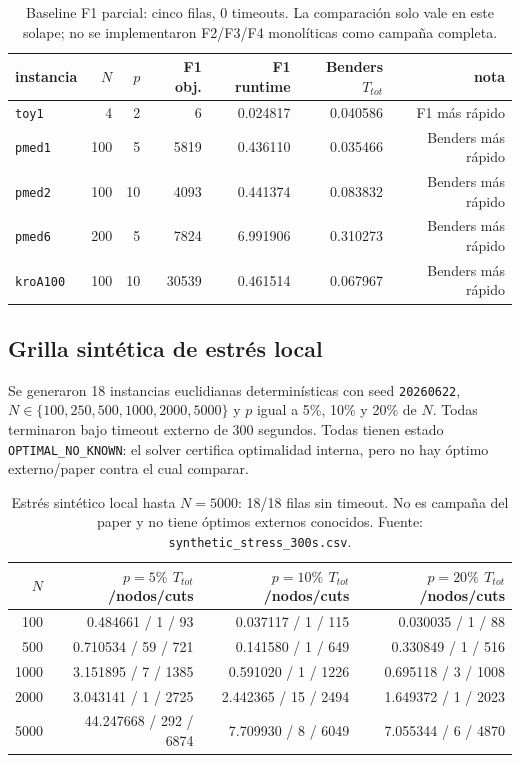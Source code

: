 \begin{table}[h]\centering\small
\begin{tabular}{lrrrrrr}
\toprule
instancia & $N$ & $p$ & F1 obj. & F1 runtime & Benders $T_{tot}$ & nota \\
\midrule
\texttt{toy1} & 4 & 2 & 6 & 0.024817 & 0.040586 & F1 más rápido \\
\texttt{pmed1} & 100 & 5 & 5819 & 0.436110 & 0.035466 & Benders más rápido \\
\texttt{pmed2} & 100 & 10 & 4093 & 0.441374 & 0.083832 & Benders más rápido \\
\texttt{pmed6} & 200 & 5 & 7824 & 6.991906 & 0.310273 & Benders más rápido \\
\texttt{kroA100} & 100 & 10 & 30539 & 0.461514 & 0.067967 & Benders más rápido \\
\bottomrule
\end{tabular}
\caption{Baseline F1 parcial: cinco filas, 0 timeouts. La comparación solo vale en este solape;
no se implementaron F2/F3/F4 monolíticas como campaña completa.}
\label{tab:f1baseline}
\end{table}

\subsection{Grilla sintética de estrés local}
Se generaron 18 instancias euclidianas determinísticas con seed \texttt{20260622},
$N\in\{100,250,500,1000,2000,5000\}$ y $p$ igual a 5\%, 10\% y 20\% de $N$. Todas terminaron bajo
timeout externo de 300 segundos. Todas tienen estado \texttt{OPTIMAL\_NO\_KNOWN}: el solver
certifica optimalidad interna, pero no hay óptimo externo/paper contra el cual comparar.

\begin{table}[h]\centering\small
\begin{tabular}{rrrr}
\toprule
$N$ & $p=5\%$ $T_{tot}$/nodos/cuts & $p=10\%$ $T_{tot}$/nodos/cuts & $p=20\%$ $T_{tot}$/nodos/cuts \\
\midrule
100 & 0.484661 / 1 / 93 & 0.037117 / 1 / 115 & 0.030035 / 1 / 88 \\
500 & 0.710534 / 59 / 721 & 0.141580 / 1 / 649 & 0.330849 / 1 / 516 \\
1000 & 3.151895 / 7 / 1385 & 0.591020 / 1 / 1226 & 0.695118 / 3 / 1008 \\
2000 & 3.043141 / 1 / 2725 & 2.442365 / 15 / 2494 & 1.649372 / 1 / 2023 \\
5000 & 44.247668 / 292 / 6874 & 7.709930 / 8 / 6049 & 7.055344 / 6 / 4870 \\
\bottomrule
\end{tabular}
\caption{Estrés sintético local hasta $N=5000$: 18/18 filas sin timeout. No es campaña del paper y
no tiene óptimos externos conocidos. Fuente: \texttt{synthetic\_stress\_300s.csv}.}
\label{tab:synthetic}
\end{table}

